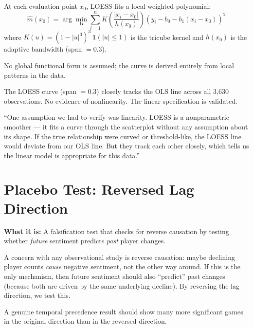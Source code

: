 \documentclass[11pt, letterpaper]{article}
\theoremstyle{definition}
\begin{document}
\begin{mathbox}
At each evaluation point $x_0$, LOESS fits a local weighted polynomial:
\[
    \hat{m}(x_0) = \arg\min_{\mathbf{b}} \sum_{i=1}^{n} K\!\left(\frac{|x_i - x_0|}{h(x_0)}\right)\!\left(y_i - b_0 - b_1(x_i - x_0)\right)^2
\]
where $K(u) = (1 - |u|^3)^3\,\mathbf{1}(|u| \leq 1)$ is the tricube kernel and $h(x_0)$ is the adaptive bandwidth (span $= 0.3$).

No global functional form is assumed; the curve is derived entirely from local patterns in the data.
\end{mathbox}

\begin{resultbox}
The LOESS curve (span $= 0.3$) closely tracks the OLS line across all 3,630 observations. No evidence of nonlinearity. The linear specification is validated.
\end{resultbox}

\begin{speakerbox}
``One assumption we had to verify was linearity.
LOESS is a nonparametric smoother --- it fits a curve through the scatterplot without any assumption about its shape.
If the true relationship were curved or threshold-like, the LOESS line would deviate from our OLS line.
But they track each other closely, which tells us the linear model is appropriate for this data.''
\end{speakerbox}

\section{Placebo Test: Reversed Lag Direction}

\textbf{What it is:} A falsification test that checks for reverse causation by testing whether \emph{future} sentiment predicts \emph{past} player changes.

\begin{whybox}
A concern with any observational study is reverse causation: maybe declining player counts \emph{cause} negative sentiment, not the other way around.
If this is the only mechanism, then future sentiment should also ``predict'' past changes (because both are driven by the same underlying decline).
By reversing the lag direction, we test this.

A genuine temporal precedence result should show many more significant games in the original direction than in the reversed direction.
\end{whybox}
\end{document}
